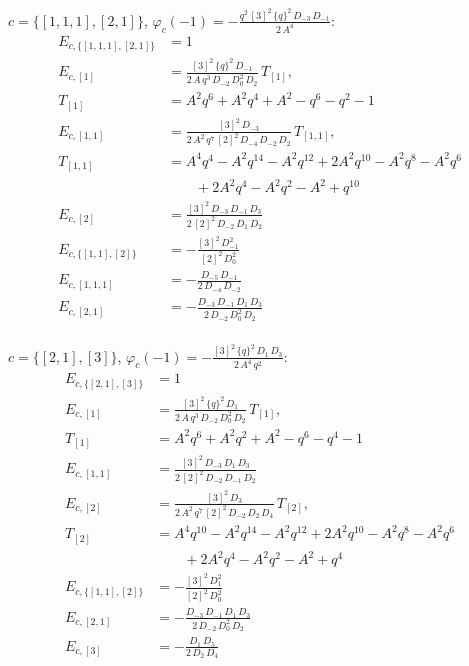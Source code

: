 \documentclass[11pt]{article}
\begin{document}
\noindent $c = \{[1,1,1],[2,1]\}$, $\varphi_c(-1) = -\frac{q^{2}\,[3]^{2}\,\{q\}^{2}\,D_{-3}\,D_{-1}}{2\,A^{4}}$:
\begin{align*}
E_{c,\{[1,1,1],[2,1]\}} &= 1 \\
E_{c,[1]} &= \frac{[3]^{2}\,\{q\}^{2}\,D_{-1}}{2\,A\,q^{3}\,D_{-2}\,D_{0}^{2}\,D_{2}}\,T_{[1]}, \\
 T_{[1]} &= A^{2}q^{6}+A^{2}q^{4}+A^{2}-q^{6}-q^{2}-1 \\
E_{c,[1,1]} &= \frac{[3]^{2}\,D_{-3}}{2\,A^{2}\,q^{7}\,[2]^{2}\,D_{-4}\,D_{-2}\,D_{2}}\,T_{[1,1]}, \\
 T_{[1,1]} &= A^{4}q^{4}-A^{2}q^{14}-A^{2}q^{12}+2A^{2}q^{10}-A^{2}q^{8}-A^{2}q^{6} \\
 &\qquad +2A^{2}q^{4}-A^{2}q^{2}-A^{2}+q^{10} \\
E_{c,[2]} &= \frac{[3]^{2}\,D_{-3}\,D_{-1}\,D_{3}}{2\,[2]^{2}\,D_{-2}\,D_{1}\,D_{2}} \\
E_{c,\{[1,1],[2]\}} &= -\frac{[3]^{2}\,D_{-1}^{2}}{[2]^{2}\,D_{0}^{2}} \\
E_{c,[1,1,1]} &= -\frac{D_{-5}\,D_{-1}}{2\,D_{-4}\,D_{-2}} \\
E_{c,[2,1]} &= -\frac{D_{-3}\,D_{-1}\,D_{1}\,D_{3}}{2\,D_{-2}\,D_{0}^{2}\,D_{2}} \\
\end{align*}

\noindent $c = \{[2,1],[3]\}$, $\varphi_c(-1) = -\frac{[3]^{2}\,\{q\}^{2}\,D_{1}\,D_{3}}{2\,A^{4}\,q^{2}}$:
\begin{align*}
E_{c,\{[2,1],[3]\}} &= 1 \\
E_{c,[1]} &= \frac{[3]^{2}\,\{q\}^{2}\,D_{1}}{2\,A\,q^{3}\,D_{-2}\,D_{0}^{2}\,D_{2}}\,T_{[1]}, \\
 T_{[1]} &= A^{2}q^{6}+A^{2}q^{2}+A^{2}-q^{6}-q^{4}-1 \\
E_{c,[1,1]} &= \frac{[3]^{2}\,D_{-3}\,D_{1}\,D_{3}}{2\,[2]^{2}\,D_{-2}\,D_{-1}\,D_{2}} \\
E_{c,[2]} &= \frac{[3]^{2}\,D_{3}}{2\,A^{2}\,q^{7}\,[2]^{2}\,D_{-2}\,D_{2}\,D_{4}}\,T_{[2]}, \\
 T_{[2]} &= A^{4}q^{10}-A^{2}q^{14}-A^{2}q^{12}+2A^{2}q^{10}-A^{2}q^{8}-A^{2}q^{6} \\
 &\qquad +2A^{2}q^{4}-A^{2}q^{2}-A^{2}+q^{4} \\
E_{c,\{[1,1],[2]\}} &= -\frac{[3]^{2}\,D_{1}^{2}}{[2]^{2}\,D_{0}^{2}} \\
E_{c,[2,1]} &= -\frac{D_{-3}\,D_{-1}\,D_{1}\,D_{3}}{2\,D_{-2}\,D_{0}^{2}\,D_{2}} \\
E_{c,[3]} &= -\frac{D_{1}\,D_{5}}{2\,D_{2}\,D_{4}} \\
\end{align*}
\end{document}
